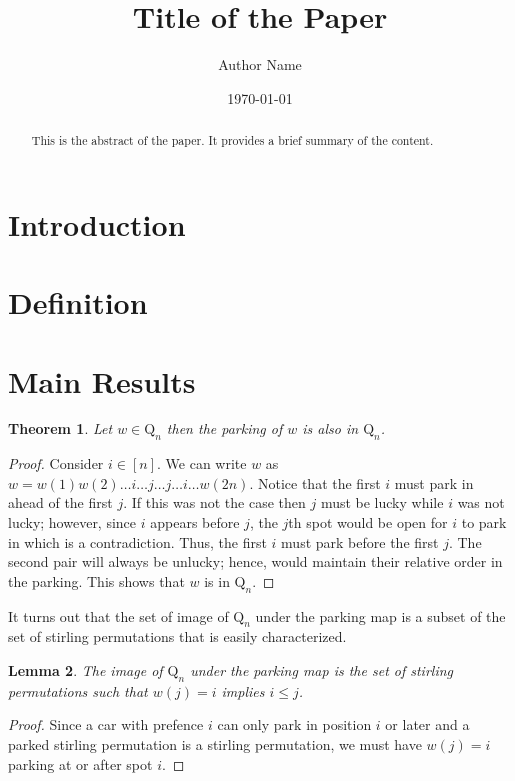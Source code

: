 \documentclass[12pt]{article}
\title{Title of the Paper}
\author{Author Name}
\date{\today}
\newtheorem{theorem}{Theorem}[section]
\newtheorem{lemma}[theorem]{Lemma}
\theoremstyle{definition}
\theoremstyle{remark}
\newcommand{\Qn}{\text{Q}_n}
\begin{document}
\maketitle

\begin{abstract}
This is the abstract of the paper. It provides a brief summary of the content.
\end{abstract}

\section{Introduction}

\section{Definition}


\section{Main Results}

\begin{theorem}
    Let $w \in \Qn$ then the parking of $w$ is also in $\Qn$.
\end{theorem}

\begin{proof}
    Consider $i \in [n]$. We can write $w$ as $w = w(1)w(2) \ldots i \ldots j \ldots j \ldots i \ldots w(2n)$. Notice that the
    first $i$ must park in ahead of the first $j$. If this was not the case then $j$ must be lucky while $i$ was not lucky; however, 
    since $i$ appears before $j$, the $j$th spot would be open for $i$ to park in which is a contradiction. Thus, the first $i$ must 
    park before the first $j$. The second pair will always be unlucky; hence, would maintain their relative order in the parking. This 
    shows that $w$ is in $\Qn$.
\end{proof}

It turns out that the set of image of $\Qn$ under the parking map is a subset of the set of stirling permutations that is 
easily characterized.

\begin{lemma}
    The image of $\Qn$ under the parking map is the set of stirling permutations such that $w(j) = i$ implies $i \leq j$.
\end{lemma}

\begin{proof}
    Since a car with prefence $i$ can only park in position $i$ or later and a parked stirling permutation is a stirling permutation, 
    we must have $w(j) = i$ parking at or after spot $i$. 
\end{proof}
\end{document}
